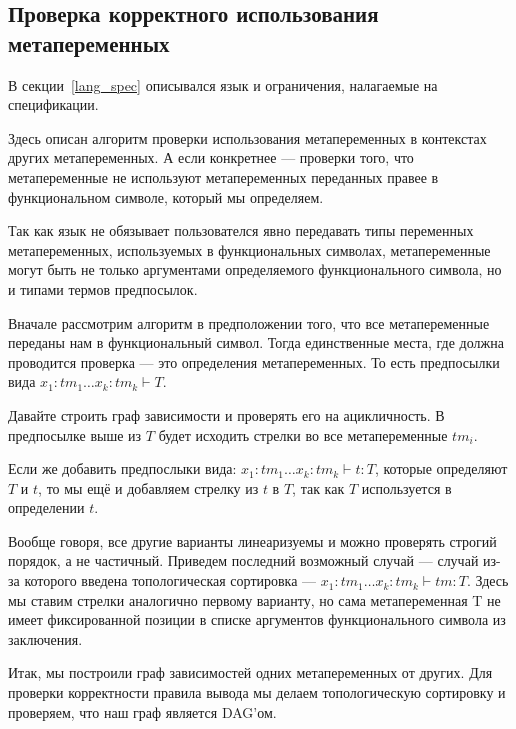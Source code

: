 \subsection{Проверка корректного использования метапеременных}\label{toposort}
В секции~\ref{lang_spec} описывался язык и ограничения, налагаемые на спецификации.

Здесь описан алгоритм проверки использования метапеременных в контекстах других метапеременных. А если конкретнее --- проверки того, что метапеременные не используют метапеременных переданных правее в функциональном символе, который мы определяем.

Так как язык не обязывает пользователся явно передавать типы переменных метапеременных, используемых в функциональных символах, метапеременные могут быть не только аргументами определяемого функционального символа, но и типами термов предпосылок.

Вначале рассмотрим алгоритм в предположении того, что все метапеременные переданы нам в функциональный символ. Тогда единственные места, где должна проводится проверка --- это определения метапеременных. То есть предпосылки вида $x_1 : tm_1 \ldots x_k : tm_k  \vdash T$.

Давайте строить граф зависимости и проверять его на ацикличность. В предпосылке выше из $T$ будет исходить стрелки во все метапеременные $tm_i$.

Если же добавить предпослыки вида: $x_1 : tm_1 \ldots x_k : tm_k  \vdash t : T$, которые определяют $T$ и $t$, то мы ещё и добавляем стрелку из $t$ в $T$, так как $T$ используется в определении $t$.

Вообще говоря, все другие варианты линеаризуемы и можно проверять строгий порядок, а не частичный. Приведем последний возможный случай --- случай из-за которого введена топологическая сортировка --- $x_1 : tm_1 \ldots x_k : tm_k  \vdash tm : T$. Здесь мы ставим стрелки аналогично первому варианту, но сама метапеременная T не имеет фиксированной позиции в списке аргументов функционального символа из заключения.

Итак, мы построили граф зависимостей одних метапеременных от других. Для проверки корректности правила вывода мы делаем топологическую сортировку и проверяем, что наш граф является DAG'ом.

























